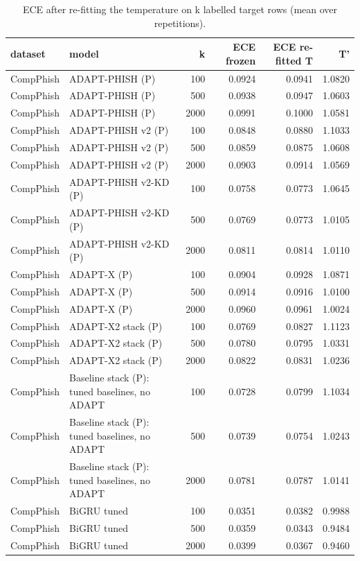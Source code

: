 \begin{table}[t]
\centering
\scriptsize
\caption{ECE after re-fitting the temperature on k labelled target rows (mean over repetitions).}
\label{tab:rev_R6_target_temperature_refit}
\begin{tabular}{llrrrr}
\toprule
dataset & model & k & ECE frozen & ECE re-fitted T & T' \\
\midrule
CompPhish & ADAPT-PHISH (P) & 100 & 0.0924 & 0.0941 & 1.0820 \\
CompPhish & ADAPT-PHISH (P) & 500 & 0.0938 & 0.0947 & 1.0603 \\
CompPhish & ADAPT-PHISH (P) & 2000 & 0.0991 & 0.1000 & 1.0581 \\
CompPhish & ADAPT-PHISH v2 (P) & 100 & 0.0848 & 0.0880 & 1.1033 \\
CompPhish & ADAPT-PHISH v2 (P) & 500 & 0.0859 & 0.0875 & 1.0608 \\
CompPhish & ADAPT-PHISH v2 (P) & 2000 & 0.0903 & 0.0914 & 1.0569 \\
CompPhish & ADAPT-PHISH v2-KD (P) & 100 & 0.0758 & 0.0773 & 1.0645 \\
CompPhish & ADAPT-PHISH v2-KD (P) & 500 & 0.0769 & 0.0773 & 1.0105 \\
CompPhish & ADAPT-PHISH v2-KD (P) & 2000 & 0.0811 & 0.0814 & 1.0110 \\
CompPhish & ADAPT-X (P) & 100 & 0.0904 & 0.0928 & 1.0871 \\
CompPhish & ADAPT-X (P) & 500 & 0.0914 & 0.0916 & 1.0100 \\
CompPhish & ADAPT-X (P) & 2000 & 0.0960 & 0.0961 & 1.0024 \\
CompPhish & ADAPT-X2 stack (P) & 100 & 0.0769 & 0.0827 & 1.1123 \\
CompPhish & ADAPT-X2 stack (P) & 500 & 0.0780 & 0.0795 & 1.0331 \\
CompPhish & ADAPT-X2 stack (P) & 2000 & 0.0822 & 0.0831 & 1.0236 \\
CompPhish & Baseline stack (P): tuned baselines, no ADAPT & 100 & 0.0728 & 0.0799 & 1.1034 \\
CompPhish & Baseline stack (P): tuned baselines, no ADAPT & 500 & 0.0739 & 0.0754 & 1.0243 \\
CompPhish & Baseline stack (P): tuned baselines, no ADAPT & 2000 & 0.0781 & 0.0787 & 1.0141 \\
CompPhish & BiGRU tuned & 100 & 0.0351 & 0.0382 & 0.9988 \\
CompPhish & BiGRU tuned & 500 & 0.0359 & 0.0343 & 0.9484 \\
CompPhish & BiGRU tuned & 2000 & 0.0399 & 0.0367 & 0.9460 \\

\end{tabular}
\end{table}
